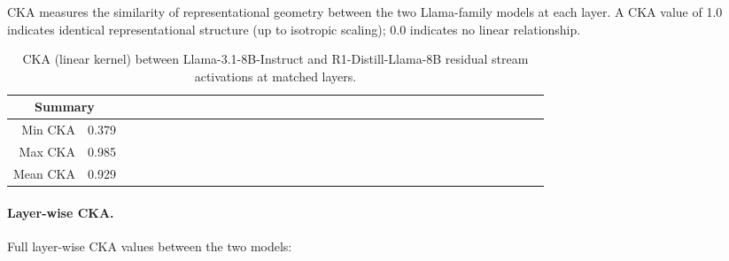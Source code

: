 \documentclass{article}
\begin{document}
CKA \citep{kornblith2019similarity} measures the similarity of
representational geometry between the two Llama-family models at each
layer.  A CKA value of 1.0 indicates identical representational
structure (up to isotropic scaling); 0.0 indicates no linear
relationship.

\begin{table}[ht]
\centering
\caption{CKA (linear kernel) between Llama-3.1-8B-Instruct and
  R1-Distill-Llama-8B residual stream activations at matched layers.}
\label{tab:cka}
\vspace{4pt}
\small
\begin{tabular}{rcrcrcrcrcrcrcrcrcrcrcrcrcrcrcrcrcrr}
\toprule
\multicolumn{2}{c}{\textbf{Summary}} \\
\midrule
Min CKA & 0.379 \\
Max CKA & 0.985 \\
Mean CKA & 0.929 \\
\bottomrule
\end{tabular}
\end{table}

\paragraph{Layer-wise CKA.}
Full layer-wise CKA values between the two models:
\end{document}
